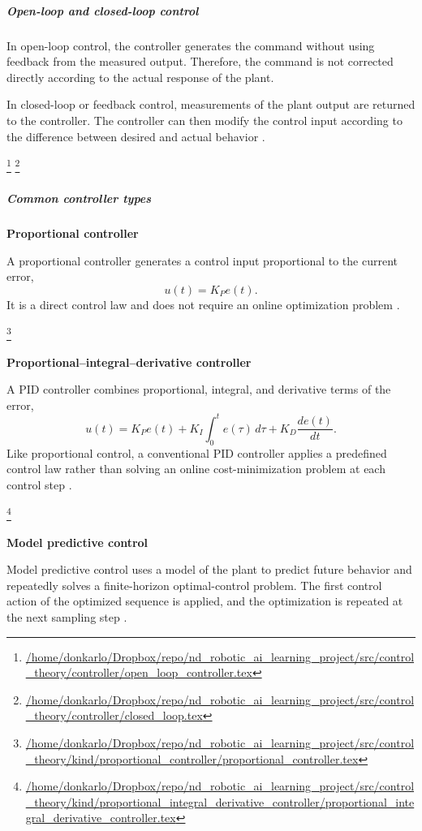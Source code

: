 \documentclass{book}
\providecommand{\ProjectDeepHeading}[2]{%
    \par\medskip\noindent\textbf{#2}\par\smallskip
}
\providecommand{\seeherefooter}[1]{\footnote{\url{#1}}}
\begin{document}
   \subparagraph{Open-loop and closed-loop control}
      In open-loop control, the controller generates the command without using feedback from the measured output. Therefore, the command is not corrected directly according to the actual response of the plant.

      In closed-loop or feedback control, measurements of the plant output are returned to the controller. The controller can then modify the control input according to the difference between desired and actual behavior \cite{astrom-2008-feedback-systems-an-introduction-for-scientists-and-engineers}.

      \seeherefooter{/home/donkarlo/Dropbox/repo/nd_robotic_ai_learning_project/src/control_theory/controller/open_loop_controller.tex}
      \seeherefooter{/home/donkarlo/Dropbox/repo/nd_robotic_ai_learning_project/src/control_theory/controller/closed_loop.tex}

   \subparagraph{Common controller types}
      \ProjectDeepHeading{3}{Proportional controller}
      A proportional controller generates a control input proportional to the current error,
      \[
         u(t)=K_P e(t).
      \]
      It is a direct control law and does not require an online optimization problem \cite{astrom-2008-feedback-systems-an-introduction-for-scientists-and-engineers}.

      \seeherefooter{/home/donkarlo/Dropbox/repo/nd_robotic_ai_learning_project/src/control_theory/kind/proportional_controller/proportional_controller.tex}

      \ProjectDeepHeading{3}{Proportional--integral--derivative controller}
      A PID controller combines proportional, integral, and derivative terms of the error,
      \[
         u(t)
         =
         K_P e(t)
         +
         K_I\int_0^t e(\ensuremath{\tau})\,d\ensuremath{\tau}
         +
         K_D\frac{de(t)}{dt}.
      \]
      Like proportional control, a conventional PID controller applies a predefined control law rather than solving an online cost-minimization problem at each control step \cite{astrom-2008-feedback-systems-an-introduction-for-scientists-and-engineers}.

      \seeherefooter{/home/donkarlo/Dropbox/repo/nd_robotic_ai_learning_project/src/control_theory/kind/proportional_integral_derivative_controller/proportional_integral_derivative_controller.tex}

      \ProjectDeepHeading{3}{Model predictive control}
      Model predictive control uses a model of the plant to predict future behavior and repeatedly solves a finite-horizon optimal-control problem. The first control action of the optimized sequence is applied, and the optimization is repeated at the next sampling step \cite{mayne-2000-constrained-model-predictive-control-stability-and-optimality}.
\end{document}
